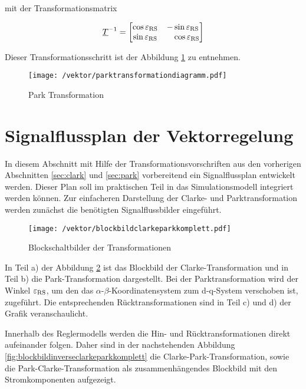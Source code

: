 mit der Transformationsmatrix

\begin{align}
	\underline{T}^{-1} =
	\begin{bmatrix}
		\cos{\varepsilon_{\mathrm{RS}}} & -\sin{\varepsilon_{\mathrm{RS}}} \\
		\sin{\varepsilon_{\mathrm{RS}}} & ~~~\cos{\varepsilon_{\mathrm{RS}}}
	\end{bmatrix}
	\label{parkmatrixinvers}
\end{align}

Dieser Transformationsschritt ist der Abbildung \ref{fig:parktransformationdiagramm} zu entnehmen.

\begin{figure}[h]
	\centering
	\texttt{[image: /vektor/parktransformationdiagramm.pdf]}
	\label{fig:parktransformationdiagramm}
	\caption{Park Transformation}
\end{figure}


\section{Signalflussplan der Vektorregelung}\label{sec:signalflussplan}

In diesem Abschnitt mit Hilfe der Transformationsvorschriften aus den vorherigen Abschnitten \ref{sec:clark} und \ref{sec:park} vorbereitend ein Signalflussplan entwickelt werden.
Dieser Plan soll im praktischen Teil in das Simulationsmodell integriert werden können.
Zur einfacheren Darstellung der Clarke- und Parktransformation werden zunächst die benötigten Signalflussbilder eingeführt.

\begin{figure}[h]
	\centering
	\texttt{[image: /vektor/blockbildclarkeparkkomplett.pdf]}
	\label{fig:blockbildclarkeparkkomplett}
	\caption{Blockschaltbilder der Transformationen}
\end{figure}

In Teil a) der Abbildung \ref{fig:blockbildclarkeparkkomplett} ist das Blockbild der Clarke-Transformation und in Teil b) die Park-Transformation dargestellt. 
Bei der Parktransformation wird der Winkel $\varepsilon_{\mathrm{RS}}$, um den das $\alpha$-$\beta$-Koordinatensystem zum d-q-System verschoben ist, zugeführt.
Die entsprechenden Rücktransformationen sind in Teil c) und d) der Grafik veranschaulicht.

Innerhalb des Reglermodells werden die Hin- und Rücktransformationen direkt aufeinander folgen. Daher sind in der nachstehenden Abbildung \ref{fig:blockbildinverseclarkeparkkomplett} die Clarke-Park-Transformation, sowie die Park-Clarke-Transformation als zusammenhängendes Blockbild mit den Stromkomponenten aufgezeigt.

